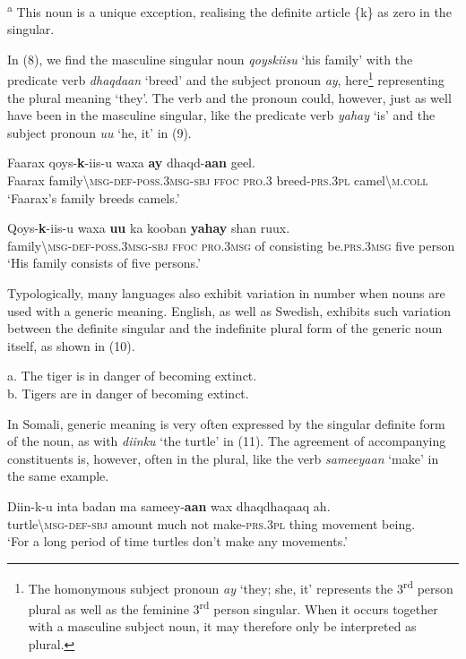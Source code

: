 \documentclass[output=paper]{langsci/langscibook}
\begin{document}
\textsuperscript{a} This noun is a unique exception, realising the definite article \{k\} as zero in the singular.

In (8), we find the masculine singular noun \textit{qoyskiisu} ‘his family’ with the predicate verb \textit{dhaqdaan} ‘breed’ and the subject pronoun \textit{ay}, here\footnote{The homonymous subject pronoun \textit{ay} ‘they; she, it’ represents the 3\textsuperscript{rd} person plural as well as the feminine 3\textsuperscript{rd} person singular. When it occurs together with a masculine subject noun, it may therefore only be interpreted as plural.} representing the plural meaning ‘they’. The verb and the pronoun could, however, just as well have been in the masculine singular, like the predicate verb \textit{yahay} ‘is’ and the subject pronoun \textit{uu} ‘he, it’ in (9).

\ea
\gll Faarax  qoys-\textbf{k}{}-iis-u        waxa  \textbf{ay}    dhaqd-\textbf{aan}  geel.\\
     Faarax  family{\textbackslash}\textsc{msg-def-poss.3msg-sbj    ffoc}  \textsc{pro.3}  breed-\textsc{prs.3pl}  camel{\textbackslash}\textsc{m.coll}\\
\glt ‘Faarax’s family breeds camels.’
\z

\ea
\gll Qoys-\textbf{k}{}-iis-u      waxa  \textbf{uu}    ka  kooban    \textbf{yahay}    shan  ruux.\\
     family{\textbackslash}\textsc{msg-def-poss.3msg-sbj  ffoc  pro.3msg}  of  consisting  be.\textsc{prs.3msg}  five  person\\
\glt ‘His family consists of five persons.’
\z

Typologically, many languages also exhibit variation in number when nouns are used with a generic meaning. English, as well as Swedish, exhibits such variation between the definite singular and the indefinite plural form of the generic noun itself, as shown in (10).

\ea
 a.  The tiger is in danger of becoming extinct.\\
 b.  Tigers are in danger of becoming extinct.\\
\z

In Somali, generic meaning is very often expressed by the singular definite form of the noun, as with \textit{diinku} ‘the turtle’ in (11). The agreement of accompanying constituents is, however, often in the plural, like the verb \textit{sameeyaan} ‘make’ in the same example.

\ea
\gll Diin-k-u    inta  badan  ma  sameey-\textbf{aan}  wax  dhaqdhaqaaq  ah.\\
     turtle{\textbackslash}\textsc{msg-def-sbj  }amount  much  not  make-\textsc{prs.3pl  }thing  movement  being.\\
\glt ‘For a long period of time turtles don’t make any movements.’
\z
\end{document}
